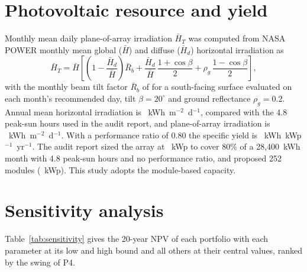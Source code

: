 \documentclass[preprint,12pt,authoryear]{elsarticle}
\begin{document}
\section{Photovoltaic resource and yield}
\label{app:pv}
Monthly mean daily plane-of-array irradiation $\bar H_T$ was computed from NASA POWER monthly mean global ($\bar H$) and diffuse ($\bar H_d$) horizontal irradiation \citep{nasapower} as
\begin{equation}
\bar H_T = \bar H\left[\left(1-\frac{\bar H_d}{\bar H}\right)\bar R_b + \frac{\bar H_d}{\bar H}\,\frac{1+\cos\beta}{2} + \rho_g\,\frac{1-\cos\beta}{2}\right],
\end{equation}
with the monthly beam tilt factor $\bar R_b$ of \citet{klein1977} for a south-facing surface evaluated on each month's recommended day, tilt $\beta = 20^\circ$ and ground reflectance $\rho_g=0.2$. Annual mean horizontal irradiation is \nGHI~kWh~m$^{-2}$~d$^{-1}$, compared with the 4.8 peak-sun hours used in the audit report, and plane-of-array irradiation is \nPOA~kWh~m$^{-2}$~d$^{-1}$. With a performance ratio of 0.80 the specific yield is \nSpecYield~kWh~kWp$^{-1}$~yr$^{-1}$. The audit report sized the array at \nStuKWp~kWp to cover 80\% of a 28,400~kWh month with 4.8 peak-sun hours and no performance ratio, and proposed 252 modules (\nStuKWpMod~kWp). This study adopts the module-based capacity.

\section{Sensitivity analysis}
\label{app:sens}
Table~\ref{tab:sensitivity} gives the 20-year NPV of each portfolio with each parameter at its low and high bound and all others at their central values, ranked by the swing of P4.

\end{document}
